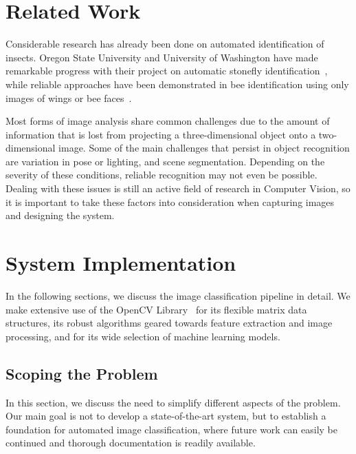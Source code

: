 \documentclass[a4paper,12pt]{article}
\begin{document}
\section{Related Work}
Considerable research has already been done on automated identification of insects. Oregon State University and University of Washington have made remarkable progress with their project on automatic stonefly identification~\cite{stonefly:article}, while reliable approaches have been demonstrated in bee identification using only images of wings or bee faces~\cite{automated_taxon:book}. 

Most forms of image analysis share common challenges due to the amount of information that is lost from projecting a three-dimensional object onto a two-dimensional image. Some of the main challenges that persist in object recognition are variation in pose or lighting, and scene segmentation. Depending on the severity of these conditions, reliable recognition may not even be possible. Dealing with these issues is still an active field of research in Computer Vision, so it is important to take these factors into consideration when capturing images and designing the system.

\section{System Implementation}
In the following sections, we discuss the image classification pipeline in detail. We make extensive use of the OpenCV Library~\cite{opencv_library} for its flexible matrix data structures, its robust algorithms geared towards feature extraction and image processing, and for its wide selection of machine learning models.

\subsection{Scoping the Problem}
In this section, we discuss the need to simplify different aspects of the problem. Our main goal is not to develop a state-of-the-art system, but to establish a foundation for automated image classification, where future work can easily be continued and thorough documentation is readily available.
\end{document}

